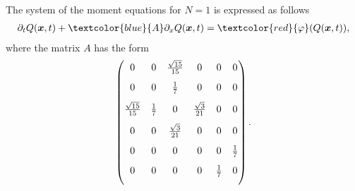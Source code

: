 \begin{frame}
	\scriptsize
	The system of the moment equations for $N=1$ is expressed as follows
	\begin{align}
		\partial_t Q(\boldsymbol{x},t) + \textcolor{blue}{A}\partial_x Q(\boldsymbol{x},t) = \textcolor{red}{\varphi} (Q(\boldsymbol{x},t)),
	\end{align}
	where the matrix $A$ has the form \\
	\vspace{8pt}
	\[
	{
		\begin{pmatrix}
			\vspace{8pt}
			0 & 0 & \frac{\sqrt{15}}{15} & 0 & 0 & 0 \\
			\vspace{8pt}
			0 & 0 & \frac{1}{7} & 0 & 0 & 0 \\
			\vspace{8pt}
			\frac{\sqrt{15}}{15} & \frac{1}{7} & 0 & \frac{\sqrt{3}}{21} & 0 &  0 \\
			\vspace{8pt}
			0 & 0 & \frac{\sqrt{3}}{21} & 0 & 0 & 0 \\
			\vspace{8pt}
			0 & 0 & 0 & 0 & 0 & \frac{1}{7}\\
			\vspace{8pt}
			0 & 0 & 0 & 0 & \frac{1}{7} & 0
		\end{pmatrix}.
	}
	\]
\end{frame}

